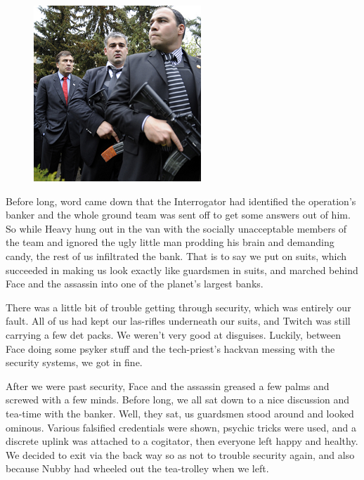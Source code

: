 \begin{figure}
	\begin{center}
		\includegraphics[width=\figwidth]{pics/3/10.png}
	\end{center}
\end{figure}
Before long, word came down that the Interrogator had identified the operation’s banker and the whole ground team was sent off to get some answers out of him. 
So while Heavy hung out in the van with the socially unacceptable members of the team and ignored the ugly little man prodding his brain and demanding candy, the rest of us infiltrated the bank. 
That is to say we put on suits, which succeeded in making us look exactly like guardsmen in suits, and marched behind Face and the assassin into one of the planet’s largest banks. 

There was a little bit of trouble getting through security, which was entirely our fault. 
All of us had kept our las-rifles underneath our suits, and Twitch was still carrying a few det packs. 
We weren’t very good at disguises. 
Luckily, between Face doing some psyker stuff and the tech-priest’s hackvan messing with the security systems, we got in fine. 

After we were past security, Face and the assassin greased a few palms and screwed with a few minds. 
Before long, we all sat down to a nice discussion and tea-time with the banker. Well, they sat, us guardsmen stood around and looked ominous. 
Various falsified credentials were shown, psychic tricks were used, and a discrete uplink was attached to a cogitator, then everyone left happy and healthy. 
We decided to exit via the back way so as not to trouble security again, and also because Nubby had wheeled out the tea-trolley when we left.

